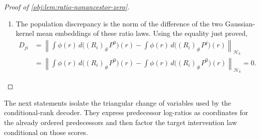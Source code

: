 \documentclass[11pt]{article}
\begin{document}
\begin{proof}[Proof of \cref{obj:lem:ratio-nonancestor-zero}]
\begin{enumerate}
\[
\int_{[0,1]^{[n]\setminus\mathcal A_i}}
\Gamma_i^0(\mathfrak a,\mathfrak b)\,d\mathfrak b=1,
\qquad
\int_{[0,1]^{[n]\setminus\mathcal A_i}}
\Gamma_i^j(\mathfrak a,\mathfrak b)\,d\mathfrak b=1 .
\]
Consequently the two complement-marginal densities on \([0,1]^{\mathcal A_i}\) are the same:
\[
\int_{[0,1]^{[n]\setminus\mathcal A_i}}
p^0(\mathfrak a\oplus\mathfrak b)\,d\mathfrak b
=
\prod_{\ell\in\mathcal A_i}
 p_\ell\bigl(\mathfrak a_\ell\mid
 \mathfrak a_{\operatorname{pa}_G(\ell)}\bigr)
=
\int_{[0,1]^{[n]\setminus\mathcal A_i}}
p^{\pi(j)}(\mathfrak a\oplus\mathfrak b)\,d\mathfrak b .
\]
Thus the projected latent laws agree:
\[
(\operatorname{pr}_{\mathcal A_i})_\#\mu^0
=
(\operatorname{pr}_{\mathcal A_i})_\#\mu^{\pi(j)} .
\]
Since \(\{\pi(i)\}\cup\operatorname{pa}_G(\pi(i))\subseteq\mathcal A_i\), the ratio map \(\rho_i\) factors through this projection.  Explicitly, the map \(\widetilde\rho_i:[0,1]^{\mathcal A_i}\to\mathbb R\) defined by
\[
\widetilde\rho_i(\mathfrak a)
=
\frac{q_{\pi(i)}(\mathfrak a_{\pi(i)})}
{p_{\pi(i)}(\mathfrak a_{\pi(i)}\mid
\mathfrak a_{\operatorname{pa}_G(\pi(i))})}
\]
satisfies \(\rho_i=\widetilde\rho_i\circ\operatorname{pr}_{\mathcal A_i}\).  Pushing the projected-law identity forward by \(\widetilde\rho_i\) gives
\[
(\rho_i)_\#\mu^0=(\rho_i)_\#\mu^{\pi(j)},
\]
and hence, by the ratio-law identifications in the preceding step,
\[
(R_i)_\#P^0=(R_i)_\#P^j .
\]

\item The population discrepancy is the norm of the difference of the two Gaussian-kernel mean embeddings of these ratio laws.  Using the equality just proved,
\[
\begin{aligned}
D_{ji}
&=
\left\|
\int \phi(r)\,d\bigl((R_i)_\#P^0\bigr)(r)
-
\int \phi(r)\,d\bigl((R_i)_\#P^j\bigr)(r)
\right\|_{\mathcal H_k}  \\
&=
\left\|
\int \phi(r)\,d\bigl((R_i)_\#P^0\bigr)(r)
-
\int \phi(r)\,d\bigl((R_i)_\#P^0\bigr)(r)
\right\|_{\mathcal H_k}
=0 .
\end{aligned}
\]
\end{enumerate}
\end{proof}

The next statements isolate the triangular change of variables used by the conditional-rank decoder. They express predecessor log-ratios as coordinates for the already ordered predecessors and then factor the target intervention law conditional on those scores.
\end{document}
